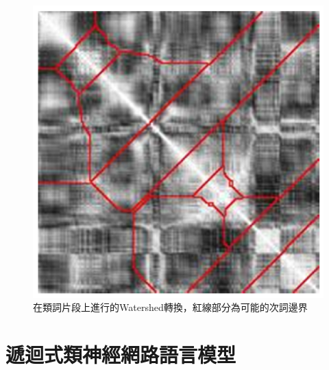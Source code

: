\begin{figure}
\centering
\includegraphics[scale=0.3]{images/chap2_watershed.png}
\caption{在類詞片段上進行的Watershed轉換，紅線部分為可能的次詞邊界} \label{fig:chap2_watershed}
\end{figure}


\section{遞迴式類神經網路語言模型}
